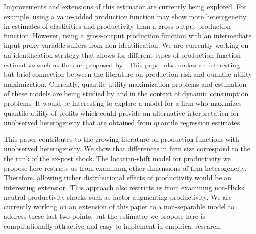 \documentclass[11pt]{article}
\begin{document}
Improvements and extensions of this estimator are currently being explored. For example, using a value-added production function may show more heterogeneity in estimates of elasticities and productivity than a gross-output production function. However, using a gross-output production function with an intermediate input proxy variable suffers from non-identification. We are currently working on an identification strategy that allows for different types of production function estimators such as the one proposed by \cite{Gandhi2020}. This paper also makes an interesting but brief connection between the literature on production risk and quantile utility maximization. Currently, quantile utility maximization problems and estimation of these models are being studied by \cite{Castro2017} and \cite{qgmm} in the context of dynamic consumption problems. It would be interesting to explore a model for a firm who maximizes quantile utility of profits which could provide an alternative interpretation for unobserved heterogeneity that are obtained from quantile regression estimates.

This paper contributes to the growing literature on production functions with unobserved heterogeneity. We show that differences in firm size correspond to the the rank of the ex-post shock. The location-shift model for productivity we propose here restricts us from examining other dimensions of firm heterogeneity. Therefore, allowing richer distributional effects of productivity would be an interesting extension. This approach also restricts us from examining non-Hicks neutral productivity shocks such as factor-augmenting productivity. We are currently working on an extension of this paper to a non-separable model to address these last two points, but the estimator we propose here is computationally attractive and easy to implement in empirical research.    




\pagebreak
\newpage




\end{document}
